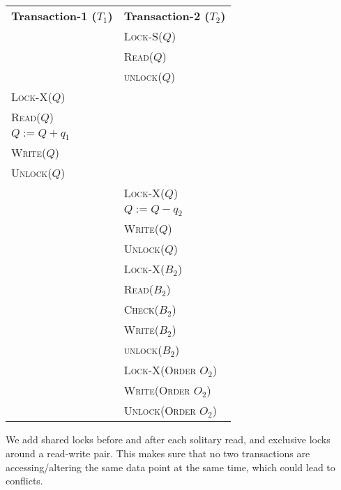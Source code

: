 \begin{center}
    \begin{adjustbox}{width=\textwidth}
        \begin{tabularx}{\textwidth}{|X|X|}
        \hline
        \multirow{2}{*}{\textbf{Transaction-1 ($T_{1}$)}} & \multirow{2}{*}{\textbf{Transaction-2 ($T_{2}$)}} \\
        & \\ \hline
        & \textsc{Lock-S($Q$)} \\
        & \textsc{Read($Q$)} \\
        & \textsc{unlock($Q$)} \\
        \textsc{Lock-X($Q$)} & \\
        \textsc{Read($Q$)} & \\
        \textsc{$Q := Q + q_{1}$} & \\
        \textsc{Write($Q$)} & \\
        \textsc{Unlock($Q$)} & \\
        & \textsc{Lock-X($Q$)} \\
        & \textsc{$Q := Q - q_{2}$} \\
        & \textsc{Write($Q$)} \\
        & \textsc{Unlock($Q$)} \\
        & \textsc{Lock-X($B_{2}$)} \\
        & \textsc{Read($B_{2}$)} \\
        & \textsc{Check($B_{2}$)} \\
        & \textsc{Write($B_{2}$)} \\
        & \textsc{unlock($B_{2}$)} \\
        & \textsc{Lock-X(Order $O_{2}$)} \\
        & \textsc{Write(Order $O_{2}$)} \\
        & \textsc{Unlock(Order $O_{2}$)} \\
        \hline
        \end{tabularx}
    \end{adjustbox}
\end{center}
\vspace*{10pt}
We add shared locks before and after each solitary read, and exclusive locks around a
read-write pair. This makes sure that no two transactions are accessing/altering the
same data point at the same time, which could lead to conflicts.